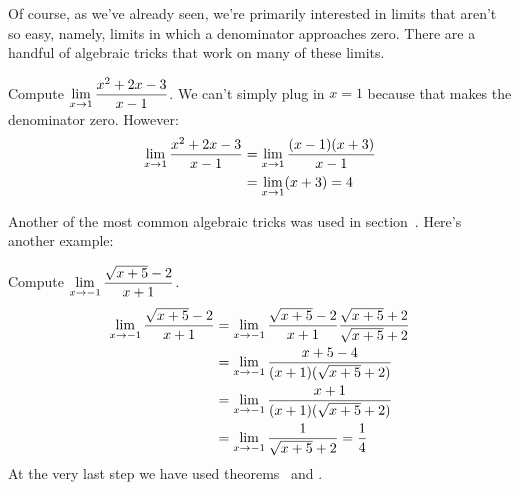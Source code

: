 Of course, as we've already seen, we're primarily interested in limits
that aren't so easy, namely, limits in which a denominator approaches
zero. There are a handful of algebraic tricks that work on many of
these limits.

\begin{example}
Compute $\displaystyle\lim_{x\to1}{x^2+2x-3\over x-1}$. We can't
simply plug in $x=1$ because that makes the denominator zero. 
However:
\begin{align*}
\lim_{x\to1}{x^2+2x-3\over x-1}&=\lim_{x\to1}{(x-1)(x+3)\over x-1} \\
&=\lim_{x\to1}(x+3)=4 \\
\end{align*}
\vskip-10pt
\end{example}

Another of the most common algebraic tricks was used in
section~. Here's another example:

\begin{example}
Compute $\displaystyle\lim_{x\to-1} {\sqrt{x+5}-2\over x+1}$.
\begin{align*}
\lim_{x\to-1} {\sqrt{x+5}-2\over x+1}&=
\lim_{x\to-1} {\sqrt{x+5}-2\over x+1}{\sqrt{x+5}+2\over \sqrt{x+5}+2} \\
&=\lim_{x\to-1} {x+5-4\over (x+1)(\sqrt{x+5}+2)} \\
&=\lim_{x\to-1} {x+1\over (x+1)(\sqrt{x+5}+2)} \\
&=\lim_{x\to-1} {1\over \sqrt{x+5}+2}={1\over4} \\
\end{align*}
At the very last step we have used theorems~ and .
\end{example}




